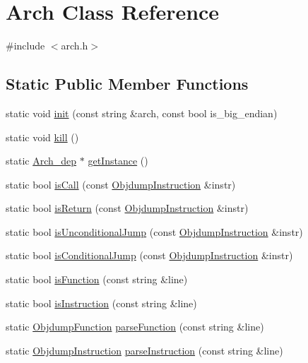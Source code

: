 \hypertarget{classArch}{}\section{Arch Class Reference}
\label{classArch}


{\ttfamily \#include $<$arch.\+h$>$}

\subsection*{Static Public Member Functions}
\begin{DoxyCompactItemize}
\item 
static void \hyperlink{classArch_a6e55f92618422dfae2ecca4a8b760749}{init} (const string \&arch, const bool is\+\_\+big\+\_\+endian)
\item 
static void \hyperlink{classArch_a82f5b240caba345011c64b87f69d3573}{kill} ()
\item 
static \hyperlink{classArch__dep}{Arch\+\_\+dep} $\ast$ \hyperlink{classArch_a384595c0b0c27547c494ce68ea30390d}{get\+Instance} ()
\item 
static bool \hyperlink{classArch_a48a567260b0b9213386f2d1826f8e21c}{is\+Call} (const \hyperlink{classObjdumpInstruction}{Objdump\+Instruction} \&instr)
\item 
static bool \hyperlink{classArch_ad7b08b24c7d2e633ccb773fe9bd22489}{is\+Return} (const \hyperlink{classObjdumpInstruction}{Objdump\+Instruction} \&instr)
\item 
static bool \hyperlink{classArch_a852783c61c3b3c8d5b1025938fb59694}{is\+Unconditional\+Jump} (const \hyperlink{classObjdumpInstruction}{Objdump\+Instruction} \&instr)
\item 
static bool \hyperlink{classArch_a4384bfd7646ca7e0c945d6fb3b36db6f}{is\+Conditional\+Jump} (const \hyperlink{classObjdumpInstruction}{Objdump\+Instruction} \&instr)
\item 
static bool \hyperlink{classArch_a7c6ebd1702f075660199527678bd8612}{is\+Function} (const string \&line)
\item 
static bool \hyperlink{classArch_abcdc8f59823fa08c8dc1e06f67591e60}{is\+Instruction} (const string \&line)
\item 
static \hyperlink{classObjdumpFunction}{Objdump\+Function} \hyperlink{classArch_a086a563f23dcbab36b7238d131201471}{parse\+Function} (const string \&line)
\item 
static \hyperlink{classObjdumpInstruction}{Objdump\+Instruction} \hyperlink{classArch_a15814eafabeb6142fa46098767617d83}{parse\+Instruction} (const string \&line)

\end{DoxyCompactItemize}
